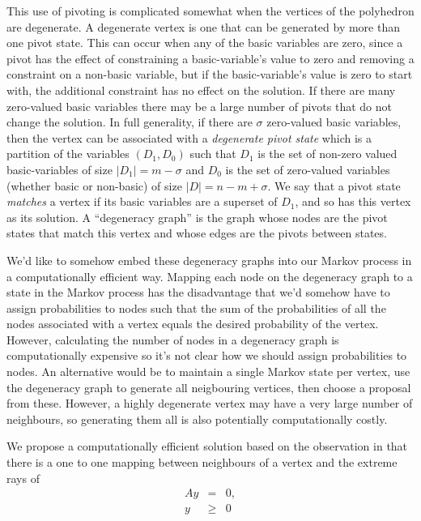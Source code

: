 \documentclass{article}
\begin{document}
This use of pivoting is complicated somewhat when the vertices of the polyhedron are degenerate. A degenerate vertex is one that can be generated by more than one pivot state. This can occur when any of the basic variables are zero, since a pivot has the effect of constraining a basic-variable's value to zero and removing a constraint on a non-basic variable, but if the basic-variable's value is zero to start with, the additional constraint has no effect on the solution. If there are many zero-valued basic variables there may be a large number of pivots that do not change the solution. In full generality, if there are $\sigma$ zero-valued basic variables, then the vertex can be associated with a \textit{degenerate pivot state} which is a partition of the variables $(D_1,D_0)$ such that $D_1$ is the set of non-zero valued basic-variables of size $|D_1| = m-\sigma$ and $D_0$ is the set of zero-valued variables (whether basic or non-basic) of size $|D| = n-m+\sigma$. We say that a pivot state \textit{matches} a vertex if its basic variables are a superset of $D_1$, and so has this vertex as its solution. A  ``degeneracy graph''\cite{zornig93degeneracy} is the graph whose nodes are the pivot states that match this vertex and whose edges are the pivots between states.

We'd like to somehow embed these degeneracy graphs into our Markov process in a computationally efficient way. Mapping each node on the degeneracy graph to a state in the Markov process has the disadvantage that we'd somehow have to assign probabilities to nodes such that the sum of the probabilities of all the nodes associated with a vertex equals the desired probability of the vertex. However, calculating the number of nodes in a degeneracy graph is computationally expensive\cite{zornig93degeneracy} so it's not clear how we should assign probabilities to nodes. An alternative would be to maintain a single Markov state per vertex, use the degeneracy graph to generate all neigbouring vertices, then choose a proposal from these. However, a highly degenerate vertex may have a very large number of neighbours, so generating them all is also potentially computationally costly\cite{gal1992new}\cite{yamada1994enumerating}.

We propose a computationally efficient solution based on the observation in \cite{yamada1994enumerating} that there is a one to one mapping between neighbours of a vertex and the extreme rays of
\begin{eqnarray*}
Ay & = & 0, \\
  y & \ge & 0
\end{eqnarray*}
\end{document}
